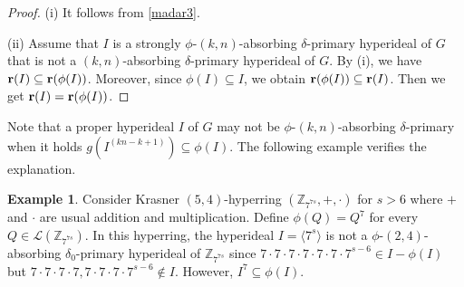 \documentclass[preprint,review,10pt]{amsart}
\newtheorem{theorem}{Theorem}[section]
\theoremstyle{definition}
\newtheorem{example}[theorem]{Example}
\newtheorem{corollary}[theorem]{Corollary}
\theoremstyle{remark}
\numberwithin{equation}{section}
\begin{document}
\begin{proof}
(i) It follows from \ref{madar3}.

(ii) Assume that $I$ is a strongly $\phi$-$(k,n)$-absorbing $\delta$-primary hyperideal of $G$  that is not a $(k,n)$-absorbing $\delta$-primary hyperideal of $G$.  By (i), we have ${\bf r}(I) \subseteq {\bf r}(\phi(I))$. Moreover, since $\phi(I) \subseteq I$, we obtain ${\bf r}(\phi(I)) \subseteq {\bf r}(I)$. Then we get ${\bf r}(I)={\bf r}(\phi(I))$.
\end{proof}
Note that a proper hyperideal $I$ of $G$ may not be $\phi$-$(k,n)$-absorbing $\delta$-primary when it holds $g(I^{(kn-k+1)}) \subseteq \phi(I)$. The following example verifies the explanation. 
\begin{example} \label{mansooreh} 
Consider Krasner $(5,4)$-hyperring $(\mathbb{Z}_{7^{7s}},+,\cdot)$ for $s>6$   where $+$ and $\cdot$ are usual addition and multiplication. Define $\phi(Q)=Q^7$ for every $Q \in \mathcal{L}(\mathbb{Z}_{7^{7s}})$. In this hyperring, the hyperideal $I=\langle 7^s \rangle$ is not a $\phi$-$(2,4)$-absorbing $\delta_0$-primary hyperideal of $\mathbb{Z}_{7^{7s}}$ since $7\cdot7\cdot7\cdot7\cdot7\cdot7\cdot7^{s-6} \in I - \phi(I)$ but $7\cdot7\cdot7\cdot7, 7\cdot7\cdot7\cdot7^{s-6} \notin I$. However, $I^7 \subseteq \phi(I)$.
\end{example}
\end{document}
